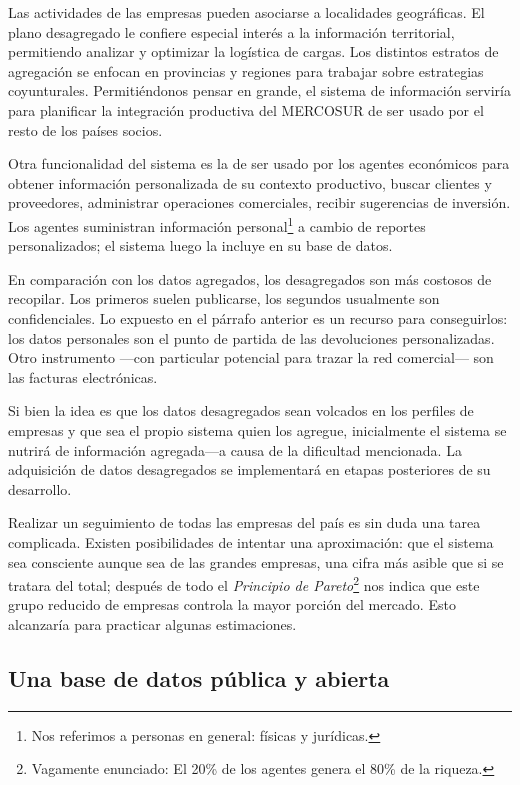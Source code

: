 \documentclass[a4paper]{report}
\begin{document}
Las actividades de las empresas pueden asociarse a localidades geográficas. El plano desagregado le confiere especial interés a la información territorial, permitiendo analizar y optimizar la logística de cargas. Los distintos estratos de agregación se enfocan en provincias y regiones para trabajar sobre estrategias coyunturales. Permitiéndonos pensar en grande, el sistema de información serviría para planificar la integración productiva del MERCOSUR de ser usado por el resto de los países socios.

Otra funcionalidad del sistema es la de ser usado por los agentes económicos para obtener información personalizada de su contexto productivo, buscar clientes y proveedores, administrar operaciones comerciales, recibir sugerencias de inversión. Los agentes suministran información personal\footnote{Nos referimos a personas en general: físicas y jurídicas.} a cambio de reportes personalizados; el sistema luego la incluye en su base de datos.

En comparación con los datos agregados, los desagregados son más costosos de recopilar. Los primeros suelen publicarse, los segundos usualmente son confidenciales. Lo expuesto en el párrafo anterior es un recurso para conseguirlos: los datos personales son el punto de partida de las devoluciones personalizadas. Otro instrumento —con particular potencial para trazar la red comercial— son las facturas electrónicas.

Si bien la idea es que los datos desagregados sean volcados en los perfiles de empresas y que sea el propio sistema quien los agregue, inicialmente el sistema se nutrirá de información agregada—a causa de la dificultad mencionada. La adquisición de datos desagregados se implementará en etapas posteriores de su desarrollo.

Realizar un seguimiento de todas las empresas del país es sin duda una tarea complicada. Existen posibilidades de intentar una aproximación: que el sistema sea consciente aunque sea de las grandes empresas, una cifra más asible que si se tratara del total; después de todo el \textit{Principio de Pareto}\footnote{Vagamente enunciado: El 20\% de los agentes genera el 80\% de la riqueza.} nos indica que este grupo reducido de empresas controla la mayor porción del mercado. Esto alcanzaría para practicar algunas estimaciones.

\subsection*{Una base de datos pública y abierta}
\end{document}
